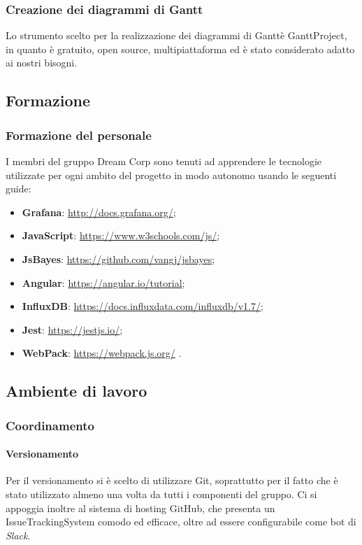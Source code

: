                 \subsubsection{Creazione dei diagrammi di Gantt}
                    Lo strumento scelto per la realizzazione dei diagrammi di Gantt\pedice è GanttProject,
                    in quanto è gratuito, open source, multipiattaforma ed è stato considerato adatto
                    ai nostri bisogni.
                \subsection{Formazione}            
                    \subsubsection{Formazione del personale}
                        I membri del gruppo Dream Corp sono tenuti ad apprendere le tecnologie utilizzate per ogni ambito del progetto in modo autonomo usando le seguenti guide:
                    \begin{itemize}
                        \item \textbf{Grafana}: \url{http://docs.grafana.org/};
                        \item \textbf{JavaScript}: \url{https://www.w3schools.com/js/};
                        \item \textbf{JsBayes}: \url{https://github.com/vangj/jsbayes};
                        \item \textbf{Angular}: \url{https://angular.io/tutorial};
                        \item \textbf{InfluxDB}: \url{https://docs.influxdata.com/influxdb/v1.7/};
                        \item \textbf{Jest}: \url{https://jestjs.io/};
                        \item \textbf{WebPack}: \url{https://webpack.js.org/} .
                    \end{itemize}
                \subsection{Ambiente di lavoro}
                    \subsubsection{Coordinamento}
                        \paragraph{Versionamento} 
                            Per il versionamento si è scelto di utilizzare Git, soprattutto per il fatto che è stato utilizzato almeno una volta da tutti i componenti del gruppo. Ci si appoggia inoltre al sistema di hosting GitHub, che presenta un IssueTrackingSystem comodo ed efficace, oltre ad essere configurabile come bot di \textit{Slack}.
